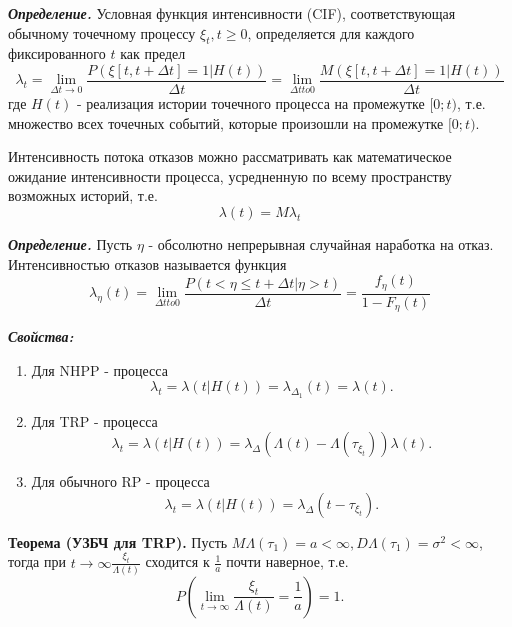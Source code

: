 {\bfseries \textit{Определение.}} Условная функция интенсивности (CIF), соответствующая обычному точечному процессу $\xi_t, t \geqslant 0$, определяется для каждого фиксированного $t$ как предел
\begin{equation}
\lambda_t = \lim_{\Delta t \to 0} \frac{ P(\xi[t, t + \Delta t] = 1 | H(t))}{\Delta t} = \lim_{\Delta t to 0} \frac{ M(\xi[t, t + \Delta t] = 1 | H(t))}{\Delta t} 
\end{equation}
где $H(t)$ - реализация истории точечного процесса на промежутке $[0; t)$, т.е. множество всех точечных событий, которые произошли на промежутке $[0; t)$.

Интенсивность потока отказов можно рассматривать как математическое ожидание интенсивности процесса, усредненную по всему пространству возможных историй, т.е.
\begin{equation}
\lambda(t) = M\lambda_t
\end{equation}

{\bfseries \textit{Определение.}} Пусть $\eta$ - обсолютно непрерывная случайная наработка на отказ. Интенсивностью отказов называется функция
\begin{equation}
\lambda_\eta(t) = \lim_{\Delta t to 0} \frac{P(t < \eta \leqslant t + \Delta t | \eta > t)}{\Delta t} = \frac{f_\eta(t)}{1 - F_\eta(t)}
\end{equation}

{\bfseries \textit{Свойства:} }

\begin{enumerate}

\item Для NHPP - процесса
\begin{equation}
\lambda_t = \lambda (t | H(t)) = \lambda_{\Delta_1} (t) = \lambda (t).
\end{equation}

\item Для TRP - процесса
\begin{equation}
\lambda_t = \lambda(t | H(t)) = \lambda_\Delta(\Lambda(t) - \Lambda(\tau_{\xi_t})) \lambda(t).
\end{equation}

\item Для обычного RP - процесса
\begin{equation}
\lambda_t = \lambda(t | H(t)) = \lambda_\Delta(t - \tau_{\xi_t}).
\end{equation}

\end{enumerate}

{\bfseries Теорема (УЗБЧ для TRP).} Пусть $M\Lambda(\tau_1) = a < \infty, D\Lambda(\tau_1) = \sigma^2 < \infty$, тогда при ${t \to \infty} \frac{\xi_t}{\Lambda(t)}$ сходится к $\frac{1}{a}$ почти наверное, т.е.
\begin{equation}
P(\lim_{t \to \infty}  \frac{\xi_t}{\Lambda(t)} = \frac{1}{a}) = 1.
\end{equation}

